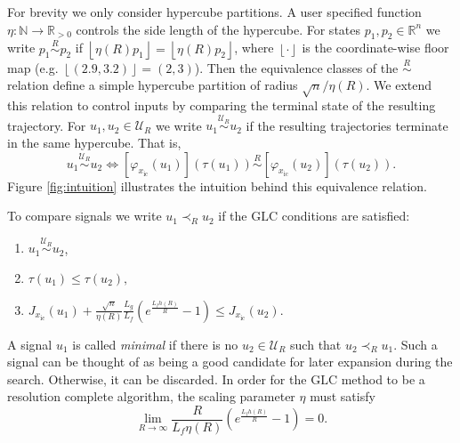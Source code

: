 \documentclass{llncs}
\newcommand{\GLC}{\ensuremath{\mathrm{GLC}}\xspace}
\begin{document}
%
For brevity we only consider hypercube partitions.
%
A user specified function $\eta:\mathbb{N}\rightarrow\mathbb{R}_{>0}$ controls the side length of the hypercube. 
%
For states $p_1,p_2\in\mathbb{R}^n$ we write $p_1\overset{R}{\sim}p_2$ if $\left\lfloor \eta(R)p_1\right\rfloor =\left\lfloor \eta(R)p_2\right\rfloor$, where $\left\lfloor \cdot\right\rfloor $ is the coordinate-wise floor map (e.g. $\left\lfloor (2.9,3.2) \right\rfloor = (2,3)$). 
%
Then the equivalence classes of the $\overset{R}\sim$ relation define a simple hypercube partition of radius $\sqrt{n}/\eta(R)$.    
%
We extend this relation to control inputs by comparing the terminal state of the resulting trajectory. 
%
For $u_1,u_2 \in \mathcal{U}_R$ we write $u_{1}\overset{\mathcal{U}_R}{\sim}u_{2}$ if the resulting trajectories terminate in the same hypercube. That is,
%
\begin{equation}\label{eq:equiv_signal}
u_{1}\overset{\mathcal{U}_R}{\sim}u_{2} \Leftrightarrow [\varphi_{x_\mathrm{ic}}(u_{1})](\tau(u_{1})) \overset{R}{\sim}  [\varphi_{x_\mathrm{ic}}(u_{2})](\tau(u_{2})) .
\end{equation}
%
Figure \ref{fig:intuition} illustrates the intuition behind this equivalence relation.
%
%
%

%
To compare signals we write $u_{1}\prec_{R}u_{2}$ if the \GLC conditions are satisfied:
%
\begin{enumerate}[label=\textbf{GLC-\arabic*},itemindent=0.75cm] 
\item \label{glc1} $u_{1}\overset{\mathcal{U}_R}\sim u_{2}$,
\item \label{glc2} $\tau(u_{1})\leq\tau(u_{2}),$
\item \label{glc3} $J_{x_\mathrm{ic}}(u_{1})+\frac{\sqrt{n}}{\eta(R)}\frac{L_{g}}{L_{f}}\left(e^{\frac{L_{f}h(R)}{R}}-1\right) \leq J_{x_\mathrm{ic}}(u_{2}).$
\end{enumerate}
%
A signal $u_1$ is called \textit{minimal} if there is no $u_2\in \mathcal{U}_R$ such that $u_{2}\prec_{R}u_{1}$. Such a signal can be thought of as being a good candidate for later expansion during the search. Otherwise, it can be discarded.
%
In order for the \GLC method to be a resolution complete algorithm, the scaling parameter $\eta$ must satisfy  
%
\begin{equation}
\lim_{R\rightarrow\infty}\frac{R}{L_f\eta(R)}\left(e^{\frac{L_{f}h(R)}{R}}-1\right)=0.\label{eq:partition_scaling}
\end{equation}
%  
%
%  
\end{document}
